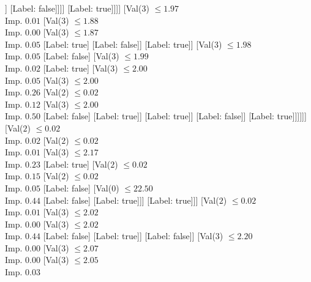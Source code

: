 \documentclass[margin=10pt]{standalone}
\begin{document}
\begin{forest}
								[Label: false]
								[Val($3$) $ \leq 2.00$ \\ Imp. $0.11$
									[Label: true]
									[Val($3$) $ \leq 2.01$ \\ Imp. $0.05$
										[Val($3$) $ \leq 2.01$ \\ Imp. $0.18$
											[Label: false]
											[Label: true]]
										[Label: false]]]]
							[Label: true]]]]
				[Val($3$) $ \leq 1.97$ \\ Imp. $0.01$
					[Val($3$) $ \leq 1.88$ \\ Imp. $0.00$
						[Val($3$) $ \leq 1.87$ \\ Imp. $0.05$
							[Label: true]
							[Label: false]]
						[Label: true]]
					[Val($3$) $ \leq 1.98$ \\ Imp. $0.05$
						[Label: false]
						[Val($3$) $ \leq 1.99$ \\ Imp. $0.02$
							[Label: true]
							[Val($3$) $ \leq 2.00$ \\ Imp. $0.05$
								[Val($3$) $ \leq 2.00$ \\ Imp. $0.26$
									[Val($2$) $ \leq 0.02$ \\ Imp. $0.12$
										[Val($3$) $ \leq 2.00$ \\ Imp. $0.50$
											[Label: false]
											[Label: true]]
										[Label: true]]
									[Label: false]]
								[Label: true]]]]]]
			[Val($2$) $ \leq 0.02$ \\ Imp. $0.02$
				[Val($2$) $ \leq 0.02$ \\ Imp. $0.01$
					[Val($3$) $ \leq 2.17$ \\ Imp. $0.23$
						[Label: true]
						[Val($2$) $ \leq 0.02$ \\ Imp. $0.15$
							[Val($2$) $ \leq 0.02$ \\ Imp. $0.05$
								[Label: false]
								[Val($0$) $ \leq 22.50$ \\ Imp. $0.44$
									[Label: false]
									[Label: true]]]
							[Label: true]]]
					[Val($2$) $ \leq 0.02$ \\ Imp. $0.01$
						[Val($3$) $ \leq 2.02$ \\ Imp. $0.00$
							[Val($3$) $ \leq 2.02$ \\ Imp. $0.44$
								[Label: false]
								[Label: true]]
							[Label: false]]
						[Val($3$) $ \leq 2.20$ \\ Imp. $0.00$
							[Val($3$) $ \leq 2.07$ \\ Imp. $0.00$
								[Val($3$) $ \leq 2.05$ \\ Imp. $0.03$

\end{forest}
\end{document}
